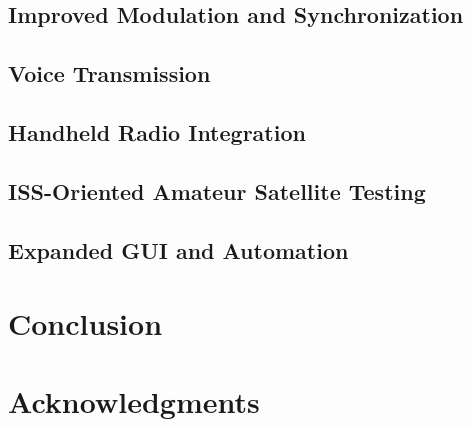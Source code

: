 \documentclass[conference]{IEEEtran}
\begin{document}
\subsection{Improved Modulation and Synchronization}

\subsection{Voice Transmission}

\subsection{Handheld Radio Integration}

\subsection{ISS-Oriented Amateur Satellite Testing}

\subsection{Expanded GUI and Automation}

\section{Conclusion}

\section*{Acknowledgments}



\end{document}

